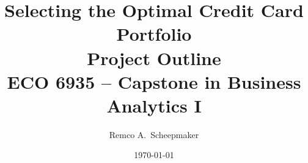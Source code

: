 \documentclass[11pt, letterpaper]{article}
\begin{document}
\doublespacing %

\title{Selecting the Optimal Credit Card Portfolio\\
       Project Outline\\
       {\large ECO 6935 -- Capstone in Business Analytics I}}
\author{Remco A.~Scheepmaker}
\date{\today}

\maketitle

% 















\end{document}
